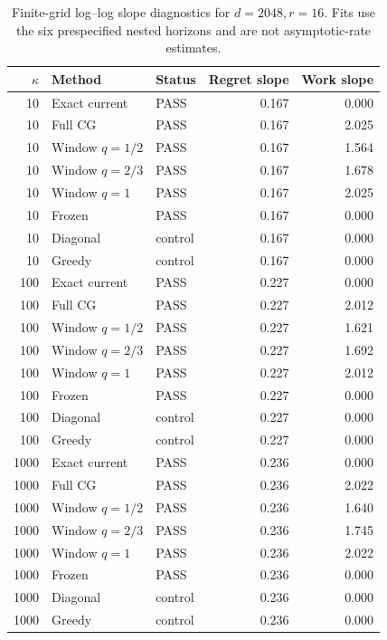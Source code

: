 \begin{table}[p]
\centering\scriptsize
\begin{tabular}{rllrr}
\toprule
$\kappa$ & Method & Status & Regret slope & Work slope \\
\midrule
10 & Exact current & PASS & 0.167 & 0.000 \\
10 & Full CG & PASS & 0.167 & 2.025 \\
10 & Window $q=1/2$ & PASS & 0.167 & 1.564 \\
10 & Window $q=2/3$ & PASS & 0.167 & 1.678 \\
10 & Window $q=1$ & PASS & 0.167 & 2.025 \\
10 & Frozen & PASS & 0.167 & 0.000 \\
10 & Diagonal & control & 0.167 & 0.000 \\
10 & Greedy & control & 0.167 & 0.000 \\
100 & Exact current & PASS & 0.227 & 0.000 \\
100 & Full CG & PASS & 0.227 & 2.012 \\
100 & Window $q=1/2$ & PASS & 0.227 & 1.621 \\
100 & Window $q=2/3$ & PASS & 0.227 & 1.692 \\
100 & Window $q=1$ & PASS & 0.227 & 2.012 \\
100 & Frozen & PASS & 0.227 & 0.000 \\
100 & Diagonal & control & 0.227 & 0.000 \\
100 & Greedy & control & 0.227 & 0.000 \\
1000 & Exact current & PASS & 0.236 & 0.000 \\
1000 & Full CG & PASS & 0.236 & 2.022 \\
1000 & Window $q=1/2$ & PASS & 0.236 & 1.640 \\
1000 & Window $q=2/3$ & PASS & 0.236 & 1.745 \\
1000 & Window $q=1$ & PASS & 0.236 & 2.022 \\
1000 & Frozen & PASS & 0.236 & 0.000 \\
1000 & Diagonal & control & 0.236 & 0.000 \\
1000 & Greedy & control & 0.236 & 0.000 \\
\bottomrule
\end{tabular}
\caption{Finite-grid log--log slope diagnostics for $d=2048,r=16$.  Fits use the six prespecified nested horizons and are not asymptotic-rate estimates.}
\label{tab:certified-scaling-fits-9}
\end{table}
